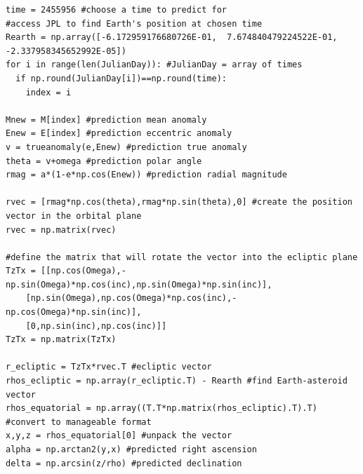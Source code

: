 \documentclass[a4paper,12pt]{article}
\begin{document}
\begin{appendices}
\begin{verbatim}
time = 2455956 #choose a time to predict for
#access JPL to find Earth's position at chosen time
Rearth = np.array([-6.172959176680726E-01,  7.674840479224522E-01, -2.337958345652992E-05])
for i in range(len(JulianDay)): #JulianDay = array of times
  if np.round(JulianDay[i])==np.round(time):
    index = i

Mnew = M[index] #prediction mean anomaly
Enew = E[index] #prediction eccentric anomaly
v = trueanomaly(e,Enew) #prediction true anomaly
theta = v+omega #prediction polar angle
rmag = a*(1-e*np.cos(Enew)) #prediction radial magnitude

rvec = [rmag*np.cos(theta),rmag*np.sin(theta),0] #create the position vector in the orbital plane
rvec = np.matrix(rvec)

#define the matrix that will rotate the vector into the ecliptic plane
TzTx = [[np.cos(Omega),-np.sin(Omega)*np.cos(inc),np.sin(Omega)*np.sin(inc)],
    [np.sin(Omega),np.cos(Omega)*np.cos(inc),-np.cos(Omega)*np.sin(inc)],
    [0,np.sin(inc),np.cos(inc)]]
TzTx = np.matrix(TzTx)

r_ecliptic = TzTx*rvec.T #ecliptic vector
rhos_ecliptic = np.array(r_ecliptic.T) - Rearth #find Earth-asteroid vector
rhos_equatorial = np.array((T.T*np.matrix(rhos_ecliptic).T).T) #convert to manageable format
x,y,z = rhos_equatorial[0] #unpack the vector
alpha = np.arctan2(y,x) #predicted right ascension
delta = np.arcsin(z/rho) #predicted declination

\end{verbatim}
\normalsize

\end{appendices}
\end{document}
